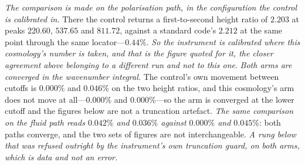 \documentclass[11pt,a4paper]{article}
\theoremstyle{plain}
\theoremstyle{definition}
\theoremstyle{remark}
\begin{document}
\emph{The comparison is made on the polarisation path, in the configuration the control is calibrated in.}
There the control returns a first-to-second height ratio of $2.203$ at peaks $220.60$, $537.65$
and $811.72$, against a standard code's $2.212$ at the same point through the same
locator---$0.44\%$. \emph{So the instrument is calibrated where this cosmology's number is
taken, and that is the figure quoted for it, the closer agreement above belonging to a different run and not to this
one}. \emph{Both arms are converged in the wavenumber integral.} The
control's own movement between cutoffs is $0.000\%$ and $0.046\%$ on the two height ratios, and this
cosmology's arm does not move at all---$0.000\%$ and $0.000\%$---so the arm is converged at
the lower cutoff and the figures below are not a truncation artefact. \emph{The same comparison on the
fluid path reads $0.042\%$ and $0.036\%$ against $0.000\%$ and $0.045\%$}: both paths converge, and the
two sets of figures are not interchangeable. \emph{A rung below that was refused
outright by the instrument's own truncation guard, on both arms, which is data and not an error.}
\end{document}
